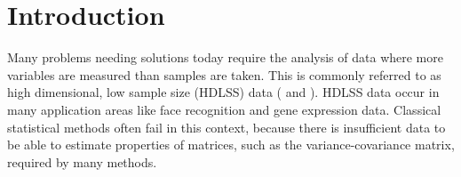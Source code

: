 %
%

\section{Introduction} 


Many problems needing solutions today require the analysis of data where more variables are measured than samples are taken. This is commonly referred to as high dimensional, low sample size (HDLSS) data (\cite{hall:2005} and \cite{marron:2007}). %
HDLSS data occur in many application areas like face recognition and gene expression data. Classical statistical methods often fail in this context, because there is insufficient data to be able to estimate properties of matrices, such as the variance-covariance matrix, required by many methods. 

